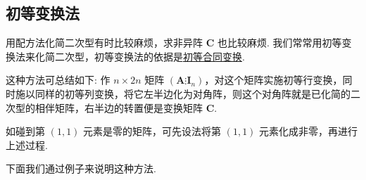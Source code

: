 \documentclass[../../main.tex]{subfiles}
\begin{document}
\subsection{初等变换法}

用配方法化简二次型有时比较麻烦，求非异阵 $\boldsymbol{C}$ 也比较麻烦. 我们常常用初等变换法来化简二次型，初等变换法的依据是\hyperref[lemma:初等合同变换]{初等合同变换}.

这种方法可总结如下: 作 $n\times 2n$ 矩阵 $(\boldsymbol{A}\vdots\boldsymbol{I}_n)$，对这个矩阵实施初等行变换，同时施以同样的初等列变换，将它左半边化为对角阵，则这个对角阵就是已化简的二次型的相伴矩阵，右半边的转置便是变换矩阵 $\boldsymbol{C}$.

如碰到第 $(1,1)$ 元素是零的矩阵，可先设法将第 $(1,1)$ 元素化成非零，再进行上述过程. 

\vspace{0.5cm}

下面我们通过例子来说明这种方法.
\end{document}
